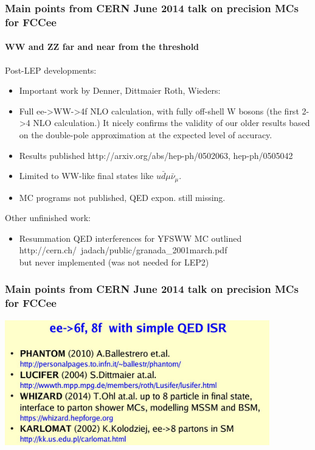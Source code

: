\documentclass{beamer}
\newcommand{\crd}{\color{red}}
\newcommand{\ns}{\normalsize}
\begin{document}
\begin{frame}[fragile]
\frametitle{\bf\ns 
 Main points from CERN June 2014 talk on precision MCs for FCCee}
\framesubtitle{\large\bf\crd WW and ZZ far and near from the threshold}

Post-LEP developments:
\begin{itemize}
\item
Important work by Denner, Dittmaier Roth, Wieders:\\
\item
Full ee->WW->4f NLO calculation, with fully off-shell W bosons
(the first 2->4 NLO calculation.) 
It nicely confirms the validity of our older results based on the double-pole approximation at the expected level of accuracy.
\item
Results published http://arxiv.org/abs/hep-ph/0502063, hep-ph/0505042
\item
Limited to WW-like final states like
$u \bar{d}  \mu \bar{\nu}_\mu$.
\item
MC programs not published, QED expon. still missing.
\end{itemize}
Other unfinished work:
\begin{itemize}
\item
Resummation QED interferences for YFSWW MC outlined\\ http://cern.ch/~jadach/public/granada\_2001march.pdf\\
but never implemented (was not needed for LEP2)
\end{itemize}


\end{frame}

\begin{frame}[fragile]
\frametitle{\bf\ns 
 Main points from CERN June 2014 talk on precision MCs for FCCee}

\includegraphics[width=115mm]{./sli10.jpg}
\end{frame}
\end{document}
